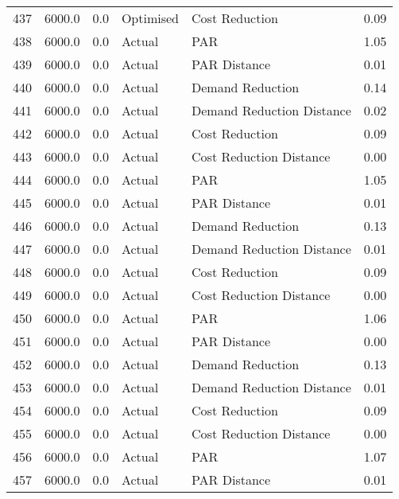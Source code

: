 \begin{longtable}{lrrllr}
437  &       6000.0 &     0.0 &      Optimised &             Cost Reduction &   0.09 \\
438  &       6000.0 &     0.0 &         Actual &                        PAR &   1.05 \\
439  &       6000.0 &     0.0 &         Actual &               PAR Distance &   0.01 \\
440  &       6000.0 &     0.0 &         Actual &           Demand Reduction &   0.14 \\
441  &       6000.0 &     0.0 &         Actual &  Demand Reduction Distance &   0.02 \\
442  &       6000.0 &     0.0 &         Actual &             Cost Reduction &   0.09 \\
443  &       6000.0 &     0.0 &         Actual &    Cost Reduction Distance &   0.00 \\
444  &       6000.0 &     0.0 &         Actual &                        PAR &   1.05 \\
445  &       6000.0 &     0.0 &         Actual &               PAR Distance &   0.01 \\
446  &       6000.0 &     0.0 &         Actual &           Demand Reduction &   0.13 \\
447  &       6000.0 &     0.0 &         Actual &  Demand Reduction Distance &   0.01 \\
448  &       6000.0 &     0.0 &         Actual &             Cost Reduction &   0.09 \\
449  &       6000.0 &     0.0 &         Actual &    Cost Reduction Distance &   0.00 \\
450  &       6000.0 &     0.0 &         Actual &                        PAR &   1.06 \\
451  &       6000.0 &     0.0 &         Actual &               PAR Distance &   0.00 \\
452  &       6000.0 &     0.0 &         Actual &           Demand Reduction &   0.13 \\
453  &       6000.0 &     0.0 &         Actual &  Demand Reduction Distance &   0.01 \\
454  &       6000.0 &     0.0 &         Actual &             Cost Reduction &   0.09 \\
455  &       6000.0 &     0.0 &         Actual &    Cost Reduction Distance &   0.00 \\
456  &       6000.0 &     0.0 &         Actual &                        PAR &   1.07 \\
457  &       6000.0 &     0.0 &         Actual &               PAR Distance &   0.01 \\

\end{longtable}
